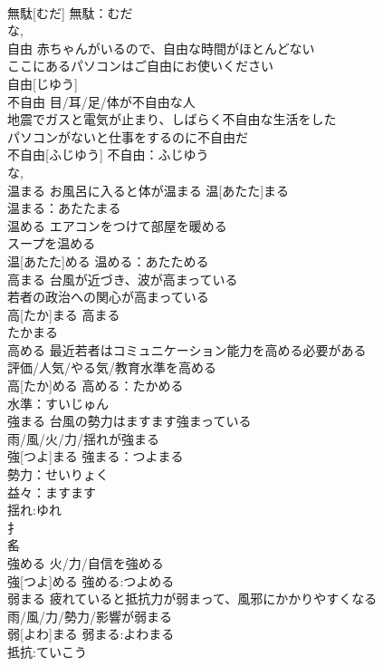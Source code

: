 \documentclass[8pt]{extreport}
\begin{document}
\begin{CJK}{UTF8}{min}
\\	無駄[むだ]			無駄：むだ
\\	な, 
\\	自由	赤ちゃんがいるので、自由な時間がほとんどない 
\\	ここにあるパソコンはご自由にお使いください 
\\	自由[じゆう]						
\\	不自由	目/耳/足/体が不自由な人 
\\	地震でガスと電気が止まり、しばらく不自由な生活をした 
\\	パソコンがないと仕事をするのに不自由だ 
\\	不自由[ふじゆう]			不自由：ふじゆう
\\	な, 
\\	温まる	お風呂に入ると体が温まる	温[あたた]まる	
\\	温まる：あたたまる
\\	温める	エアコンをつけて部屋を暖める 
\\	スープを温める 
\\	温[あたた]める			温める：あたためる
\\	高まる	台風が近づき、波が高まっている 
\\	若者の政治への関心が高まっている 
\\	高[たか]まる			高まる 
\\	たかまる 
\\	高める	最近若者はコミュニケーション能力を高める必要がある 
\\	評価/人気/やる気/教育水準を高める 
\\	高[たか]める			高める：たかめる
\\	水準：すいじゅん
\\	強まる	台風の勢力はますます強まっている 
\\	雨/風/火/力/揺れが強まる 
\\	強[つよ]まる			強まる：つよまる
\\	勢力：せいりょく
\\	益々：ますます
\\	揺れ:ゆれ
\\	扌 
\\	䍃	
\\	強める	火/力/自信を強める 
\\	強[つよ]める			強める:つよめる
\\	弱まる	疲れていると抵抗力が弱まって、風邪にかかりやすくなる 
\\	雨/風/力/勢力/影響が弱まる 
\\	弱[よわ]まる			弱まる:よわまる
\\	抵抗:ていこう

\end{CJK}
\end{document}
